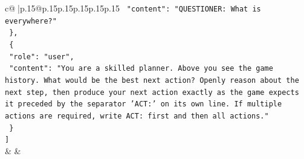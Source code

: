 \documentclass{article}
\begin{document}
{\begin{supertabular}{c@{$\;$}|p{.15\linewidth}@{}p{.15\linewidth}p{.15\linewidth}p{.15\linewidth}p{.15\linewidth}p{.15\linewidth}}
{{{\texttt{    "content": "QUESTIONER: What is everywhere?"} \\
\texttt{  \},} \\
\texttt{  \{} \\
\texttt{    "role": "user",} \\
\texttt{    "content": "You are a skilled planner. Above you see the game history. What would be the best next action? Openly reason about the next step, then produce your next action exactly as the game expects it preceded by the separator 'ACT:' on its own line. If multiple actions are required, write ACT: first and then all actions."} \\
\texttt{  \}} \\
\texttt{{]}} \\
            }
        }
    }
    & & \\ \\


\end{supertabular}}
\end{document}
